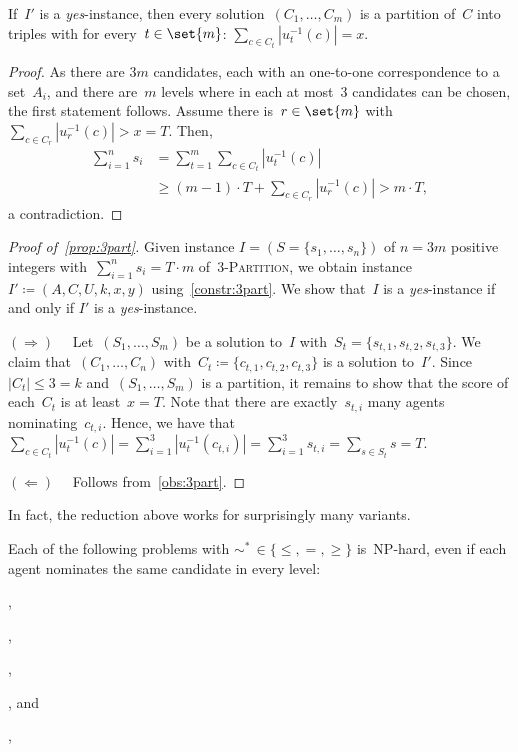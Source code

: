 \documentclass[10pt,a4paper,twocolumn]{article}
\theoremstyle{plain}
\theoremstyle{definition}
\theoremstyle{remark}
\newcommand{\RD}{$(\Rightarrow)\quad$}
\newcommand{\LD}{$(\Leftarrow)\quad$}
\newcommand{\cocl}[1]{\textrm{#1}}
\newcommand{\NP}{\cocl{NP}}
\newcommand{\yes}{\emph{yes}}
\newcommand{\ceq}{\coloneqq}
\begin{document}
{{  \begin{observation}
    \label{obs:3part}
    If~$I'$ is a \yes-instance,
    then every solution~$(C_1,\dots,C_m)$ is a partition of~$C$ into triples
    with for every~$t\in\set{m}$: $\sum_{c\in C_t} |u^{-1}_t(c)| = x$.
  \end{observation}

  \begin{proof}
  As there are $3m$ candidates, each with an one-to-one correspondence to a set~$A_i$,
  and there are~$m$ levels 
  where in each at most~$3$ candidates can be chosen,
  the first statement follows.
  Assume there is~$r\in\set{m}$ with $\sum_{c\in C_r} |u^{-1}_r(c)| > x=T$.
  Then,
  \begin{align*}
    \sum_{i=1}^n s_i &= \sum_{t=1}^m \sum_{c\in C_t} |u^{-1}_t(c)| 
    \\ 
    &\geq (m-1)\cdot T + \sum_{c\in C_r} |u^{-1}_r(c)| > m\cdot T,
  \end{align*}
  a contradiction.
  \end{proof}

  \begin{proof}[Proof of~\cref{prop:3part}]
    Given instance $I=(S=\{s_1,\dots,s_n\})$ of $n=3m$ positive integers with~$\sum_{i=1}^n s_i = T\cdot m$ of~\textsc{3-Partition},
    we obtain instance~$I'\ceq (A,C,U,k,x,y)$ using~\cref{constr:3part}.
    We show that~$I$ is a \yes-instance
    if and only if
    $I'$ is a \yes-instance.
    
    \RD{}
    Let~$(S_1,\dots,S_m)$ be a solution to~$I$ with~$S_t=\{s_{t,1},s_{t,2},s_{t,3}\}$.
    We claim that~$(C_1,\dots,C_n)$ with~$C_t\ceq \{c_{t,1},c_{t,2},c_{t,3}\}$ is a solution to~$I'$.
    Since~$|C_t|\leq 3=k$ and~$(S_1,\dots,S_m)$ is a partition,
    it remains to show that the score of each~$C_t$ is at least~$x=T$.
    Note that there are exactly~$s_{t,i}$ many agents nominating~$c_{t,i}$.
    Hence, 
    we have that~$\sum_{c\in C_t} |u^{-1}_t(c)| = \sum_{i=1}^3 |u^{-1}_t(c_{t,i})| = \sum_{i=1}^3 s_{t,i} = \sum_{s\in S_t} s = T$.
    
    
    \LD{} 
    Follows from~\cref{obs:3part}.
  \end{proof}
  
  In fact,
  the reduction above works for surprisingly many variants.

  \begin{corollary}\label{cor:3part}
  Each of the following problems with $\sim^*\,\in\{\leq,=,\geq\}$ 
  is~\NP-hard,
  even if each agent nominates the same candidate in every level:
  \begin{inparaenum}[(i)]
    \item \bicmce[$\sim^*$][$=$][$=$]{\ourOWA,\ourPREF}, 
    \item \bicmce[$\sim^*$][$=$][$\geq$]{\ourOWA,\ourPREF},
    \item \bicmce[$\sim^*$][$\leq$][$=$]{\ourOWA,\ourPREF},
    \item \bicmce[$\sim^*$][$\leq$][$\geq$]{\ourOWA,\ourPREF},
    and 
    \item \bicmce[$=$][$\geq$][$=$]{\ourOWA,\ourPREF},
  \end{inparaenum} 
  \end{corollary}
}

}
\end{document}
